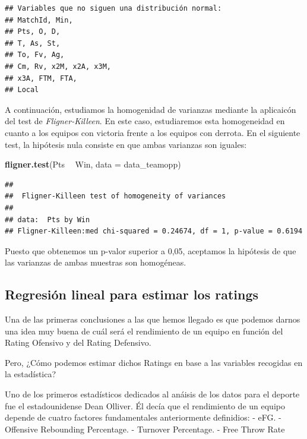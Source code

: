 \documentclass[
]{article}
\newenvironment{Shaded}{\begin{snugshade}}{\end{snugshade}}
\newcommand{\DataTypeTok}[1]{\textcolor[rgb]{0.13,0.29,0.53}{#1}}
\newcommand{\KeywordTok}[1]{\textcolor[rgb]{0.13,0.29,0.53}{\textbf{#1}}}
\newcommand{\NormalTok}[1]{#1}
\newcommand{\OperatorTok}[1]{\textcolor[rgb]{0.81,0.36,0.00}{\textbf{#1}}}
\newcommand{\StringTok}[1]{\textcolor[rgb]{0.31,0.60,0.02}{#1}}
\begin{document}
\begin{verbatim}
## Variables que no siguen una distribución normal:
## MatchId, Min, 
## Pts, O, D, 
## T, As, St, 
## To, Fv, Ag, 
## Cm, Rv, x2M, x2A, x3M, 
## x3A, FTM, FTA, 
## Local
\end{verbatim}

A continuación, estudiamos la homogenidad de varianzas mediante la
aplicaicón del test de \emph{Fligner-Killeen}. En este caso,
estudiaremos esta homogeneidad en cuanto a los equipos con victoria
frente a los equipos con derrota. En el siguiente test, la hipótesis
nula consiste en que ambas varianzas son iguales:

\begin{Shaded}
\begin{Highlighting}[]
\KeywordTok{fligner.test}\NormalTok{(Pts }\OperatorTok{~}\StringTok{ }\NormalTok{Win, }\DataTypeTok{data =}\NormalTok{ data_teamopp)}
\end{Highlighting}
\end{Shaded}

\begin{verbatim}
## 
##  Fligner-Killeen test of homogeneity of variances
## 
## data:  Pts by Win
## Fligner-Killeen:med chi-squared = 0.24674, df = 1, p-value = 0.6194
\end{verbatim}

Puesto que obtenemos un p-valor superior a 0,05, aceptamos la hipótesis
de que las varianzas de ambas muestras son homogéneas.

\newpage

\hypertarget{regresiuxf3n-lineal-para-estimar-los-ratings}{%
\subsection{Regresión lineal para estimar los
ratings}\label{regresiuxf3n-lineal-para-estimar-los-ratings}}

Una de las primeras conclusiones a las que hemos llegado es que podemos
darnos una idea muy buena de cuál será el rendimiento de un equipo en
función del Rating Ofensivo y del Rating Defensivo.

Pero, ¿Cómo podemos estimar dichos Ratings en base a las variables
recogidas en la estadística?

Uno de los primeros estadísticos dedicados al anáisis de los datos para
el deporte fue el estadounidense Dean Olliver. Él decía que el
rendimiento de un equipo depende de cuatro factores fundamentales
anteriormente definidios: - eFG. - Offensive Rebounding Percentage. -
Turnover Percentage. - Free Throw Rate
\end{document}
